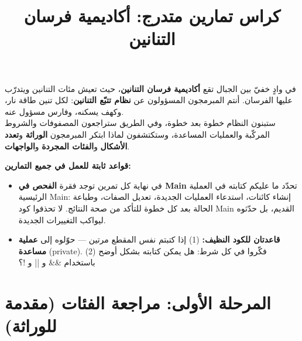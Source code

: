 \documentclass[14pt]{extarticle}
\title{كراس تمارين متدرج: أكاديمية فرسان التنانين}
\begin{document}
\maketitle
\thispagestyle{fancy}

\begin{boxDef}
في وادٍ خفيّ بين الجبال تقع \textbf{أكاديمية فرسان التنانين}، حيث تعيش مئات التنانين ويتدرّب عليها الفرسان. أنتم المبرمجون المسؤولون عن \textbf{نظام تتبّع التنانين}: لكل تنين طاقة نار، وكهف يسكنه، وفارس مسؤول عنه. \\
ستبنون النظام خطوة بعد خطوة، وفي الطريق ستراجعون المصفوفات والشروط المركّبة والعمليات المساعدة، وستكتشفون لماذا ابتكر المبرمجون \textbf{الوراثة} و\textbf{تعدد الأشكال} و\textbf{الفئات المجردة} و\textbf{الواجهات}.
\end{boxDef}

\begin{boxWarning}
\textbf{قواعد ثابتة للعمل في جميع التمارين:}
\begin{itemize}
    \item في نهاية كل تمرين توجد فقرة \textbf{الفحص في \textenglish{Main}} تحدّد ما عليكم كتابته في العملية الرئيسية \textenglish{Main}: إنشاء كائنات، استدعاء العمليات الجديدة، تعديل الصفات، وطباعة الحالة بعد كل خطوة للتأكد من صحة النتائج. لا تحذفوا كود \textenglish{Main} القديم، بل حدّثوه ليواكب التغييرات الجديدة.
    \item \textbf{قاعدتان للكود النظيف:} (1) إذا كتبتم نفس المقطع مرتين — حوّلوه إلى \textbf{عملية مساعدة} (\textenglish{private}). (2) فكّروا في كل شرط: هل يمكن كتابته بشكل أوضح باستخدام \textenglish{\&\&} و \textenglish{||} و \textenglish{!}؟
\end{itemize}
\end{boxWarning}

\section*{المرحلة الأولى: مراجعة الفئات (مقدمة للوراثة)}
\end{document}
